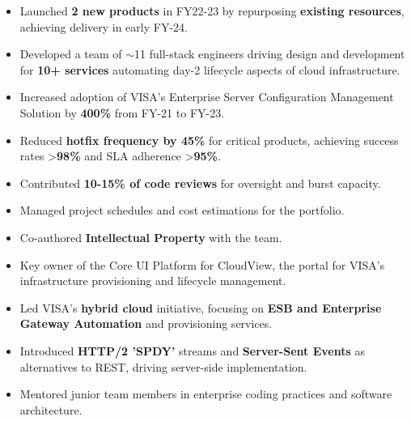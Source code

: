 \documentclass[10pt,a4paper,ragged2e,withhyper]{altacv}
\begin{document}
\begin{paracol}{2}
\begin{itemize}
  \item Launched \textbf{2 new products} in FY22-23 by repurposing \textbf{existing resources}, achieving delivery in early FY-24.
  \item Developed a team of \(\sim\)11 full-stack engineers driving design and development for \textbf{10+ services} automating day-2 lifecycle aspects of cloud infrastructure.
  \item Increased adoption of VISA's Enterprise Server Configuration Management Solution by \textbf{400\%} from FY-21 to FY-23.
  \item Reduced \textbf{hotfix frequency by 45\%} for critical products, achieving success rates >\textbf{98\%} and SLA adherence >\textbf{95\%}.
  \item Contributed \textbf{10-15\% of code reviews} for oversight and burst capacity.
  \item Managed project schedules and cost estimations for the portfolio.
  \item Co-authored \textbf{Intellectual Property} with the team.
\end{itemize}

\divider

\begin{itemize}
  \item Key owner of the Core UI Platform for CloudView, the portal for VISA’s infrastructure provisioning and lifecycle management.
  \item Led VISA’s \textbf{hybrid cloud} initiative, focusing on \textbf{ESB and Enterprise Gateway Automation} and provisioning services.
  \item Introduced \textbf{HTTP/2 'SPDY'} streams and \textbf{Server-Sent Events} as alternatives to REST, driving server-side implementation.
  \item Mentored junior team members in enterprise coding practices and software architecture.
\end{itemize}

\divider


\end{paracol}
\end{document}
